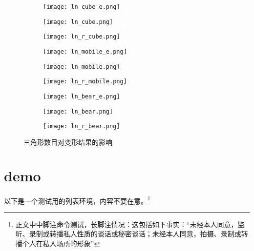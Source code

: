 \begin{figure}[htbp]
	\centering
	\begin{subfigure}[b]{.2\textwidth}
		\centering
		\texttt{[image: ln\_cube\_e.png]}
		\label{subfig:ln_cube_e}
	\end{subfigure}
	\begin{subfigure}[b]{.35\textwidth}
		\centering
		\texttt{[image: ln\_cube.png]}
		\label{subfig:ln_cube}
	\end{subfigure}
    \quad
	\begin{subfigure}[b]{.35\textwidth}
		\centering
		\texttt{[image: ln\_r\_cube.png]}
		\label{subfig:ln_r_cube}
	\end{subfigure}

	\begin{subfigure}[b]{.2\textwidth}
		\centering
		\texttt{[image: ln\_mobile\_e.png]}
		\label{subfig:ln_mobile_e}
	\end{subfigure}
    \quad
	\begin{subfigure}[b]{.35\textwidth}
		\centering
		\texttt{[image: ln\_mobile.png]}
		\label{subfig:ln_mobile}
	\end{subfigure}
    \quad
	\begin{subfigure}[b]{.35\textwidth}
		\centering
		\texttt{[image: ln\_r\_mobile.png]}
		\label{subfig:ln_r_mobile}
	\end{subfigure}

	\begin{subfigure}[b]{.2\textwidth}
		\centering
		\texttt{[image: ln\_bear\_e.png]}
		\label{subfig:ln_bear_e}
	\end{subfigure}
    \quad
	\begin{subfigure}[b]{.35\textwidth}
		\centering
		\texttt{[image: ln\_bear.png]}
		\label{subfig:ln_bear}
	\end{subfigure}
    \quad
	\begin{subfigure}[b]{.35\textwidth}
		\centering
		\texttt{[image: ln\_r\_bear.png]}
		\label{subfig:ln_r_bear}
	\end{subfigure}

	\caption{三角形数目对变形结果的影响}\label{fig:l}
\end{figure}

\section{demo}
以下是一个测试用的列表环境，内容不要在意。\footnote{正文中中脚注命令测试，长脚注情况：这包括如下事实：“未经本人同意，监听、录制或转播私人性质的谈话或秘密谈话；未经本人同意，拍摄、录制或转播个人在私人场所的形象”}

